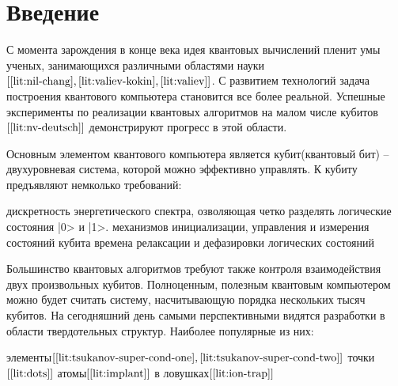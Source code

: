 \newpage
\chapter*{Введение}
С момента зарождения в конце  века идея квантовых вычислений
пленит умы ученых, занимающихся различными областями
науки$[\ref{lit:nil-chang}, \ref{lit:valiev-kokin}, \ref{lit:valiev}]$. С
развитием технологий задача построения квантового компьютера
становится все более реальной. Успешные эксперименты по реализации
квантовых алгоритмов на малом числе кубитов$[\ref{lit:nv-deutsch}]$ демонстрируют прогресс в
этой области.

    Основным элементом квантового компьютера является кубит(квантовый бит)
-- двухуровневая система, которой можно эффективно управлять. К кубиту
предъявляют немколько требований:
\begin{enumerate}
 дискретность энергетического спектра, озволяющая четко
  разделять логические состояния |0> и |1>.
 механизмов инициализации, управления и измерения
  состояний кубита
 времена релаксации и дефазировки логических состояний
\end{enumerate}

Большинство квантовых алгоритмов требуют также контроля взаимодействия
двух произвольных кубитов. Полноценным, полезным квантовым компьютером
можно будет считать систему, насчитывающую порядка нескольких тысяч
кубитов. На сегодняшний день самыми перспективными
видятся разработки в области твердотельных структур. Наиболее
популярные из них:
\begin{enumerate}
 элементы$[\ref{lit:tsukanov-super-cond-one}, \ref{lit:tsukanov-super-cond-two}]$
 точки$[\ref{lit:dots}]$
 атомы$[\ref{lit:implant}]$
 в ловушках$[\ref{lit:ion-trap}]$
\end{enumerate}

